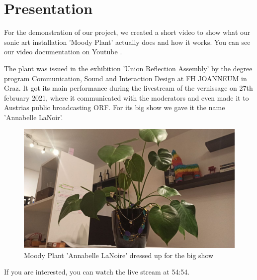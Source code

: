 \section{Presentation}

For the demonstration of our project, we created a short video to show what our sonic art installation 'Moody Plant' actually does and how it works. You can see our video documentation on Youtube \cite{youtubeDemo}.

The plant was issued in the exhibition 'Union Reflection Assembly' by the degree program Communication, Sound and Interaction Design at FH JOANNEUM in Graz. It got its main performance during the livestream of the vernissage on 27th february 2021, where it communicated with the moderators and even made it to Austrias public broadcasting ORF. For its big show we gave it the name 'Annabelle LaNoir'.


\begin{figure}[H]
\begin{center}
\includegraphics[width=0.8\linewidth]{Figures/plant2.jpg}
\caption{Moody Plant 'Annabelle LaNoire' dressed up for the big show}
\end{center}
\end{figure}



If you are interested, you can watch the live stream \cite{liveStream} at 54:54. 
